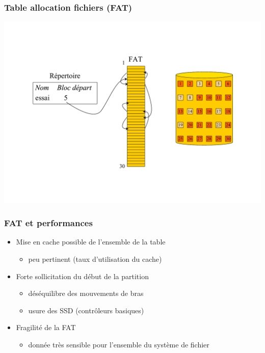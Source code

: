 \begin{frame}
\frametitle{Table allocation fichiers (FAT)}
\includegraphics[width=\textwidth]{../illustration/fat.pdf}
\end{frame}

\begin{frame}
\frametitle{FAT et performances}
\begin{itemize}
\item Mise en cache possible de l'ensemble de la table
\begin{itemize}
\item peu pertinent (taux d'utilisation du cache)
\end{itemize}
\item Forte sollicitation du début de la partition
\begin{itemize}
\item déséquilibre des mouvements de bras
\item usure des SSD (contrôleurs basiques)
\end{itemize}
\item Fragilité de la FAT
\begin{itemize}
\item donnée très sensible pour l'ensemble du système de fichier
\end{itemize}
\end{itemize}
\end{frame}


